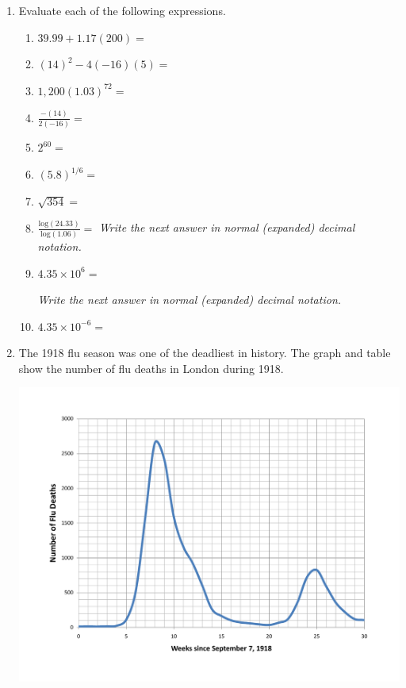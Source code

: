 \documentclass[12pt]{article}
\begin{document}
  \vspace{.2in}
 
 \hrulefill
 
\newpage  %

\begin{enumerate}
\item Evaluate each of the following expressions.

\begin{enumerate}
\item $39.99 + 1.17(200)=$
\vfill
\item $(14)^2-4(-16)(5)=$
\vfill
\item $1,200(1.03)^{72}=$
\vfill
\item $\displaystyle \frac{-(14)}{2(-16)}=$
\vfill
\item $2^{60}=$
\vfill
\item $(5.8)^{1/6}=$
\vfill
\item $\sqrt{354}=$
\vfill
\item $\displaystyle \frac{\text{log}(24.33)}{\text{log}(1.06)}=$
\vfill
\emph{Write the next answer in normal (expanded) decimal notation.}
\item $4.35 \times 10^{6}=$  


\vfill
\emph{Write the next answer in normal (expanded) decimal notation.}
\item $4.35 \times 10^{-6}=$  


\vfill
\end{enumerate}

\newpage  %

\item The 1918 flu season was one of the deadliest in history.  The graph and table show the number of flu deaths in London during 1918.

\begin{center}
\includegraphics [width = .7\textwidth] {LondonFlu.pdf}
\end{center}


\end{enumerate}
\end{document}
